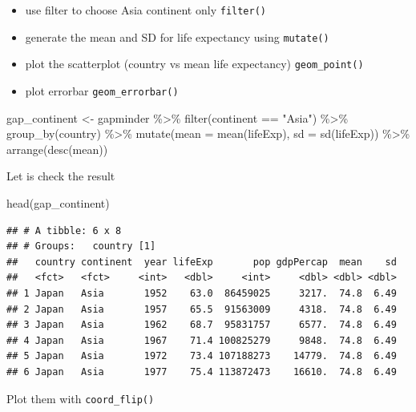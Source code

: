 \documentclass[
]{book}
\makeatletter
\newenvironment{Shaded}{\begin{snugshade}}{\end{snugshade}}
\newcommand{\AttributeTok}[1]{\textcolor[rgb]{0.61,0.61,0.61}{#1}}
\newcommand{\FunctionTok}[1]{\textcolor[rgb]{0,0,0}{#1}}
\newcommand{\NormalTok}[1]{#1}
\newcommand{\OtherTok}[1]{\textcolor[rgb]{0.37,0.37,0.37}{#1}}
\newcommand{\SpecialCharTok}[1]{\textcolor[rgb]{0,0,0}{#1}}
\newcommand{\StringTok}[1]{\textcolor[rgb]{0.5,0.5,0.5}{#1}}
\providecommand{\tightlist}{%
  \setlength{\itemsep}{0pt}\setlength{\parskip}{0pt}}
\newenvironment{kframe}{%
\medskip{}
\setlength{\fboxsep}{.8em}
 \def\at@end@of@kframe{}%
 \ifinner\ifhmode%
  \def\at@end@of@kframe{\end{minipage}}%
  \begin{minipage}{\columnwidth}%
 \fi\fi%
 \def\FrameCommand##1{\hskip\@totalleftmargin \hskip-\fboxsep
 \colorbox{shadecolor}{##1}\hskip-\fboxsep
     \hskip-\linewidth \hskip-\@totalleftmargin \hskip\columnwidth}%
 \MakeFramed {\advance\hsize-\width
   \@totalleftmargin\z@ \linewidth\hsize
   \@setminipage}}%
 {\par\unskip\endMakeFramed%
 \at@end@of@kframe}
\renewenvironment{Shaded}{\begin{kframe}}{\end{kframe}}
\makeatother
\begin{document}
\begin{itemize}
\tightlist
\item
  use filter to choose Asia continent only \texttt{filter()}
\item
  generate the mean and SD for life expectancy using \texttt{mutate()}
\item
  plot the scatterplot (country vs mean life expectancy) \texttt{geom\_point()}
\item
  plot errorbar \texttt{geom\_errorbar()}
\end{itemize}

\begin{Shaded}
\begin{Highlighting}[]
\NormalTok{gap\_continent }\OtherTok{\textless{}{-}}\NormalTok{ gapminder }\SpecialCharTok{\%\textgreater{}\%} \FunctionTok{filter}\NormalTok{(continent }\SpecialCharTok{==} \StringTok{"Asia"}\NormalTok{) }\SpecialCharTok{\%\textgreater{}\%}
  \FunctionTok{group\_by}\NormalTok{(country) }\SpecialCharTok{\%\textgreater{}\%} \FunctionTok{mutate}\NormalTok{(}\AttributeTok{mean =} \FunctionTok{mean}\NormalTok{(lifeExp), }\AttributeTok{sd =} \FunctionTok{sd}\NormalTok{(lifeExp)) }\SpecialCharTok{\%\textgreater{}\%}
  \FunctionTok{arrange}\NormalTok{(}\FunctionTok{desc}\NormalTok{(mean))}
\end{Highlighting}
\end{Shaded}

Let is check the result

\begin{Shaded}
\begin{Highlighting}[]
\FunctionTok{head}\NormalTok{(gap\_continent)}
\end{Highlighting}
\end{Shaded}

\begin{verbatim}
## # A tibble: 6 x 8
## # Groups:   country [1]
##   country continent  year lifeExp       pop gdpPercap  mean    sd
##   <fct>   <fct>     <int>   <dbl>     <int>     <dbl> <dbl> <dbl>
## 1 Japan   Asia       1952    63.0  86459025     3217.  74.8  6.49
## 2 Japan   Asia       1957    65.5  91563009     4318.  74.8  6.49
## 3 Japan   Asia       1962    68.7  95831757     6577.  74.8  6.49
## 4 Japan   Asia       1967    71.4 100825279     9848.  74.8  6.49
## 5 Japan   Asia       1972    73.4 107188273    14779.  74.8  6.49
## 6 Japan   Asia       1977    75.4 113872473    16610.  74.8  6.49
\end{verbatim}

Plot them with \texttt{coord\_flip()}
\end{document}

